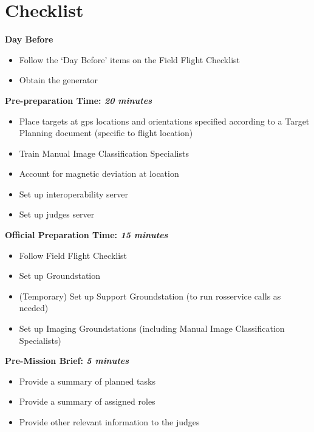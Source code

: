 \documentclass[]{auvsi_doc}
\begin{document}
\section{Checklist}

\textbf{Day Before}
\begin{itemize}
	\item Follow the `Day Before' items on the Field Flight Checklist
	\item Obtain the generator
\end{itemize}

\hrulefill

\textbf{Pre-preparation Time: \textit{20 minutes}}
\begin{itemize}
	\item Place targets at gps locations and orientations specified according to a Target Planning document (specific to flight location)
	\item Train Manual Image Classification Specialists
	\item Account for magnetic deviation at location
	\item Set up interoperability server
	\item Set up judges server 
\end{itemize}

\hrulefill

\textbf{Official Preparation Time: \textit{15 minutes}}
\begin{itemize}
	\item Follow Field Flight Checklist
	\item Set up Groundstation
	\item (Temporary) Set up Support Groundstation (to run rosservice calls as needed)
	\item Set up Imaging Groundstations (including Manual Image Classification Specialists)
\end{itemize}

\hrulefill

\textbf{Pre-Mission Brief: \textit{5 minutes}}
\begin{itemize}
	\item Provide a summary of planned tasks
	\item Provide a summary of assigned roles
	\item Provide other relevant information to the judges
\end{itemize}

\hrulefill
\end{document}
